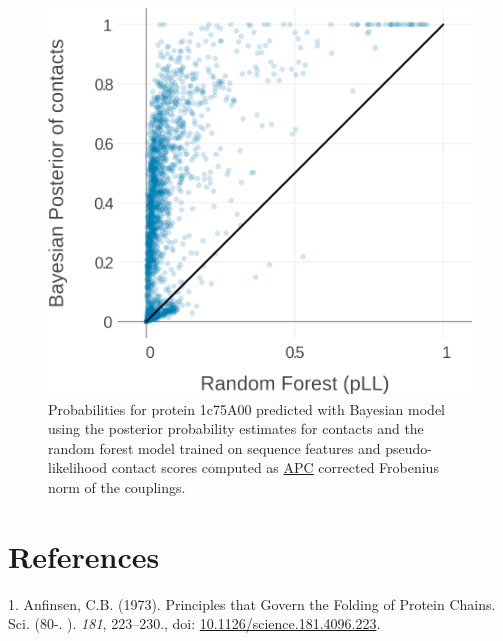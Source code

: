 \documentclass[11pt,a4paper,twoside]{book}
\theoremstyle{definition}
\theoremstyle{definition}
\theoremstyle{remark}
\begin{document}
\begin{figure}

{\centering \includegraphics[width=0.9\linewidth]{img/bayesian_model/contact_maps/1c75A00/scatter_for_Bayesian_posteriorvs_random_forest_pLL_1c75A00} 

}

\caption{Probabilities for protein 1c75A00
predicted with Bayesian model using the posterior probability estimates
for contacts and the random forest model trained on sequence features
and pseudo-likelihood contact scores computed as
\protect\hyperlink{abbrev}{APC} corrected Frobenius norm of the
couplings.}\label{fig:scatter-bayesian-1c75a00}
\end{figure}

\backmatter

\listoffigures
{}

\listoftables
{}

\chapter*{References}\label{references}

\hypertarget{refs}{}
\hypertarget{ref-Anfinsen1973}{}
1. Anfinsen, C.B. (1973). Principles that Govern the Folding of Protein
Chains. Sci. (80-. ). \emph{181}, 223--230., doi:
\href{https://doi.org/10.1126/science.181.4096.223}{10.1126/science.181.4096.223}.
\end{document}
